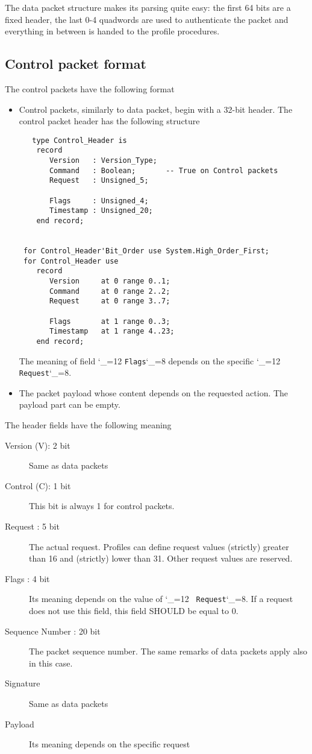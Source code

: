 \documentclass{rfc}
\def\ttt{\catcode`\_=12 \tttii}
\def\tttii#1!{{\tt #1}\catcode`\_=8{}}
\begin{document}
%
The data packet structure makes its parsing quite easy: the first 64
bits are a fixed header, the last 0-4 quadwords are used to
authenticate the packet and everything in between is handed to the
profile procedures.

\subsection{Control packet format}
\label{subsub:0.0.3;driver}

The control packets have the following format

\begin{itemize}
\item
Control packets, similarly to data packet, begin with a 32-bit header.
The control packet header has the 
following structure

\begin{verbatim}
   type Control_Header is
    record
       Version   : Version_Type;
       Command   : Boolean;       -- True on Control packets
       Request   : Unsigned_5;

       Flags     : Unsigned_4;
       Timestamp : Unsigned_20;
    end record;


 for Control_Header'Bit_Order use System.High_Order_First;
 for Control_Header use
    record
       Version     at 0 range 0..1;
       Command     at 0 range 2..2;
       Request     at 0 range 3..7;

       Flags       at 1 range 0..3;
       Timestamp   at 1 range 4..23;
    end record;
\end{verbatim}
The meaning of field \ttt Flags! depends on the specific \ttt
Request!. 
\item
The packet payload whose content depends on the requested action.  The
payload part can be empty.
\end{itemize}

The header fields have the following meaning

\begin{description}
\item[Version (V): 2 bit] Same as data packets
\item[Control (C): 1 bit] This bit is always 1 for control packets.
\item[Request : 5 bit] The actual request.  Profiles can define
  request values (strictly) greater than 16 and (strictly) lower than
  31. Other request values are reserved.
\item[Flags : 4 bit] Its meaning depends on the value of \ttt
  Request!. If a request does not use this field, this field SHOULD be
  equal to 0.
\item[Sequence Number : 20 bit] The packet sequence number.  The same
  remarks of data packets apply also in this case.
\item[Signature] Same as data packets
\item[Payload] Its meaning depends on the specific request
\end{description}
\end{document}
